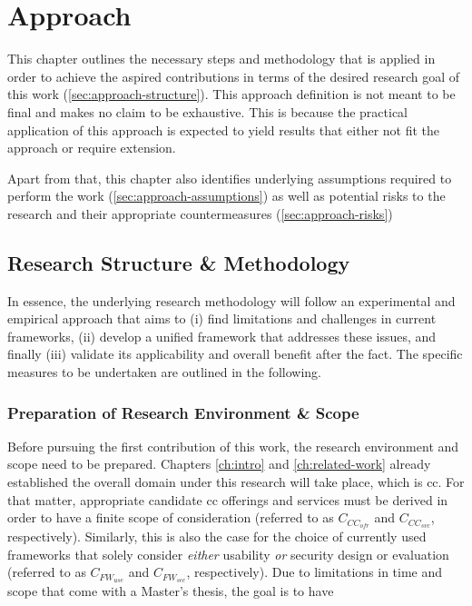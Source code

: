 
\chapter{Approach}
\label{ch:approach}

This chapter outlines the necessary steps and methodology that is applied in order to achieve the aspired contributions in terms of the desired research goal of this work (\autoref{sec:approach-structure}). This approach definition is not meant to be final and makes no claim to be exhaustive. This is because the practical application of this approach is expected to yield results that either not fit the approach or require extension.

Apart from that, this chapter also identifies underlying assumptions required to perform the work (\autoref{sec:approach-assumptions}) as well as potential risks to the research and their appropriate countermeasures (\autoref{sec:approach-risks})

\section{Research Structure \& Methodology} \label{sec:approach-structure}

In essence, the underlying research methodology will follow an experimental and empirical approach that aims to (i) find limitations and challenges in current frameworks, (ii) develop a unified framework that addresses these issues, and finally (iii) validate its applicability and overall benefit after the fact. The specific measures to be undertaken are outlined in the following.

\subsection{Preparation of Research Environment \& Scope} \label{subs:approach-structure-prepare}

Before pursuing the first contribution of this work, the research environment and scope need to be prepared. Chapters \ref{ch:intro} and \ref{ch:related-work} already established the overall domain under this research will take place, which is \acl{cc}. For that matter, appropriate candidate \ac{cc} offerings and services must be derived in order to have a finite scope of consideration (referred to as $C_{CC_{ofr}}$ and $C_{CC_{svc}}$, respectively). Similarly, this is also the case for the choice of currently used frameworks that solely consider \textit{either} usability \textit{or} security design or evaluation (referred to as $C_{FW_{use}}$ and $C_{FW_{sec}}$, respectively).
Due to limitations in time and scope that come with a Master's thesis, the goal is to have 

